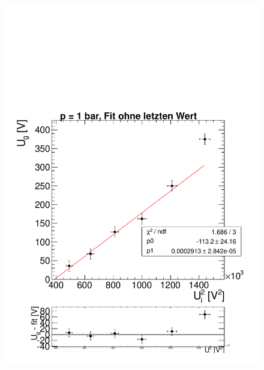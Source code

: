 \documentclass[a4paper,12pt]{article}
\begin{document}
\begin{figure}[htb]
		\centering
		\includegraphics[height = 0.3\textheight]{linRegLuft1.pdf}

\end{figure}
\end{document}
